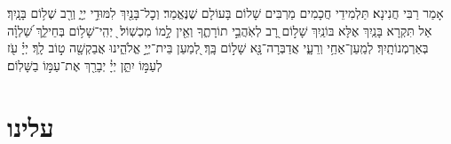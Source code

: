\documentclass[twoside, openany, parskip=half, 11pt]{book}
\begin{document}
{\vspace{-.3\baselineskip}
אָמַר רַבִּי חֲנִינָא׃ תַּלְמִידֵי חֲכָמִים מַרְבִּים שָׁלוֹם בָּעוֹלָם שֶׁנֶּאֱמַר׃ וְכׇל־בָּנַ֖יִךְ לִמּוּדֵ֣י יְיָ֑ וְרַ֖ב שְׁל֥וֹם בָּנָֽיִךְ׃ אַל תִּקְרָא בָּנַֽיִךְ אֶלָּא בּוֹנַֽיִךְ שָׁל֣וֹם רָ֭ב לְאֹֽהֲבֵ֣י תוֹרָתֶ֑ךָ וְאֵ֖ין לָ֣מוֹ מִכְשֽׁוֹל׃  ֖ יְהִֽי־שָׁל֥וֹם בְּחֵילֵ֑ךְ שַׁ֝לְוָ֗ה בְּאַרְמְנוֹתָֽיִךְ׃ לְמַֽעַן־אַחַ֥י וְרֵעָ֑י אֲדַבְּרָה־נָּ֖א שָׁל֣וֹם בָּֽךְ׃ לְ֭מַעַן בֵּית־יְיָ֣ אֱלֹהֵ֑ינוּ אֲבַקְשָׁ֖ה ט֣וֹב לָֽךְ׃ יְיָ֗ עֹ֖ז לְעַמּ֣וֹ יִתֵּ֑ן יְיָ֓ יְבָרֵ֖ךְ אֶת־עַמּ֣וֹ בַשָּׁלֽוֹם׃

\rabbiskaddish

\section*{ עלינו }

\aleinu
}

\siyyumshabbatYT

\vspace{-1\baselineskip}
\end{document}
